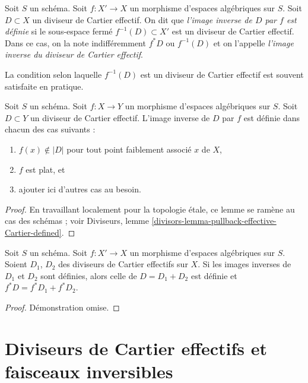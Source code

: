 \begin{definition}
\label{definition-pullback-effective-Cartier-divisor}
Soit $S$ un schéma.
Soit $f : X' \to X$ un morphisme d'espaces algébriques sur $S$.
Soit $D \subset X$
un diviseur de Cartier effectif. On dit que {\it l'image inverse de
$D$ par $f$ est définie} si le sous-espace fermé $f^{-1}(D) \subset X'$
est un diviseur de Cartier effectif. Dans ce cas, on la note indifféremment
$f^*D$ ou $f^{-1}(D)$ et on l'appelle
{\it l'image inverse du diviseur de Cartier effectif}.
\end{definition}

\noindent
La condition selon laquelle $f^{-1}(D)$ est un diviseur de Cartier effectif
est souvent satisfaite en pratique.

\begin{lemma}
\label{lemma-pullback-effective-Cartier-defined}
Soit $S$ un schéma.
Soit $f : X \to Y$ un morphisme d'espaces algébriques sur $S$.
Soit $D \subset Y$ un diviseur de Cartier effectif.
L'image inverse de $D$ par $f$ est définie dans chacun des cas suivants :
\begin{enumerate}
\item $f(x) \not \in |D|$ pour tout point faiblement associé $x$ de $X$,
\item $f$ est plat, et
\item ajouter ici d'autres cas au besoin.
\end{enumerate}
\end{lemma}

\begin{proof}
En travaillant localement pour la topologie \'etale, ce lemme se ramène au cas des schémas ; voir
Diviseurs, lemme \ref{divisors-lemma-pullback-effective-Cartier-defined}.
\end{proof}

\begin{lemma}
\label{lemma-pullback-effective-Cartier-divisors-additive}
Soit $S$ un schéma.
Soit $f : X' \to X$ un morphisme d'espaces algébriques sur $S$.
Soient $D_1$, $D_2$ des diviseurs de Cartier effectifs sur $X$.
Si les images inverses de $D_1$ et $D_2$ sont définies, alors celle
de $D = D_1 + D_2$ est définie et
$f^*D = f^*D_1 + f^*D_2$.
\end{lemma}

\begin{proof}
Démonstration omise.
\end{proof}




\section{Diviseurs de Cartier effectifs et faisceaux inversibles}
\label{section-effective-Cartier-invertible}

